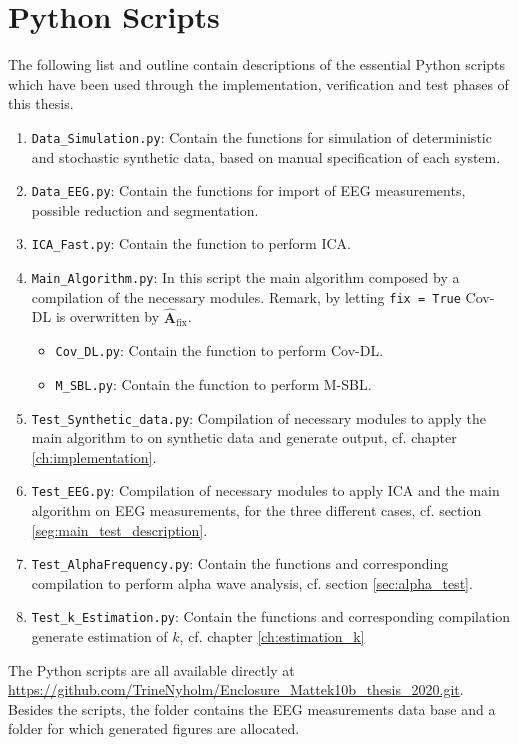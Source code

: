 \chapter{Python Scripts}\label{App:code}
The following list and outline contain descriptions of the essential Python scripts which have been used through the implementation, verification and test phases of this thesis. 
\begin{enumerate}
\item \texttt{Data\_Simulation.py}: Contain the functions for simulation of deterministic and stochastic synthetic data, based on manual specification of each system.  
\item \texttt{Data\_EEG.py}: Contain the functions for import of EEG measurements, possible reduction and segmentation.  
\item \texttt{ICA\_Fast.py}: Contain the function to perform ICA.
\item \texttt{Main\_Algorithm.py}: In this script the main algorithm composed by a compilation of the necessary modules. Remark, by letting \texttt{fix = True} Cov-DL is overwritten by $\hat{\mathbf{A}}_{\text{fix}}$. 
\begin{itemize}
\item \texttt{Cov\_DL.py}: Contain the function to perform Cov-DL.
\item \texttt{M\_SBL.py}: Contain the function to perform M-SBL.
\end{itemize} 
\item \texttt{Test\_Synthetic\_data.py}: Compilation of necessary modules to apply the main algorithm to on synthetic data and generate output, cf. chapter \ref{ch:implementation}.
\item \texttt{Test\_EEG.py}: Compilation of necessary modules to apply ICA and the main algorithm on EEG measurements, for the three different cases, cf. section \ref{seg:main_test_description}.  
\item \texttt{Test\_AlphaFrequency.py}: Contain the functions and corresponding compilation to perform alpha wave analysis, cf. section \ref{sec:alpha_test}.
\item \texttt{Test\_k\_Estimation.py}: Contain the functions and corresponding compilation generate estimation of $k$, cf. chapter \ref{ch:estimation_k} 
\end{enumerate}
The Python scripts are all available directly at \url{https://github.com/TrineNyholm/Enclosure_Mattek10b_thesis_2020.git}. Besides the scripts, the folder contains the EEG measurements data base and a folder for which generated figures are allocated.  


	                                                                                                                                                                                                                                                                 

